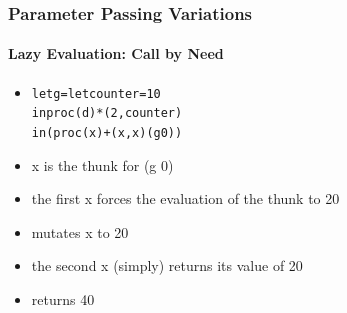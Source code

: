 \documentclass{beamer}
\begin{document}
\begin{frame}[fragile]
\frametitle{Parameter Passing Variations}
\framesubtitle{Lazy Evaluation: Call by Need}
\begin{scriptsize}
\begin{itemize}
\item<1-> 
\begin{alltt}
let g = let counter = 10
        in proc (d) *(2, counter)
in (proc (x) +(x, x) (g 0))
\end{alltt}

\item<2> x is the thunk for (g 0)

\item<3-> the first x forces the evaluation of the thunk to 20 

\item<3-> mutates x to 20

\item<4-> the second x (simply) returns its value of 20

\item<4-> returns 40


\end{itemize}
\end{scriptsize}
\end{frame}
\end{document}
